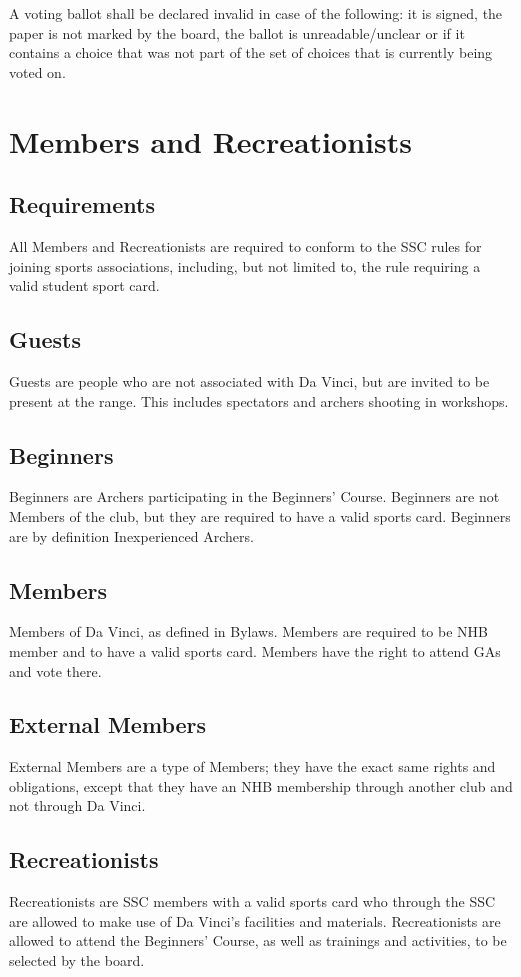 \documentclass[a4paper]{article}
\newcommand{\Asta}{Bylaws} %
\begin{document}
A voting ballot shall be declared invalid in case of the following: it is signed, the paper is not marked by the board, the ballot is unreadable/unclear or if it contains a choice that was not part of the set of choices that is currently being voted on.

\section{Members and Recreationists}
\subsection{Requirements}
All Members and Recreationists are required to conform to the SSC rules for joining sports associations, including, but not limited to, the rule requiring a valid student sport card.

\subsection{Guests}
Guests are people who are not associated with Da Vinci, but are invited to be present at the range. This includes spectators and archers shooting in workshops.

\subsection{Beginners}
Beginners are Archers participating in the Beginners' Course. Beginners are not Members of the club, but they are required to have a valid sports card. Beginners are by definition Inexperienced Archers.

\subsection{Members}
Members of Da Vinci, as defined in \Asta. Members are required to be NHB member and to have a valid sports card. Members have the right to attend GAs and vote there.

\subsection{External Members}
External Members are a type of Members; they have the exact same rights and obligations, except that they have an NHB membership through another club and not through Da Vinci.

\subsection{Recreationists}
Recreationists are SSC members with a valid sports card who through the SSC are allowed to make use of Da Vinci's facilities and materials. Recreationists are allowed to attend the Beginners' Course, as well as trainings and activities, to be selected by the board. \\
\end{document}
